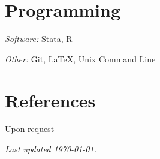 \documentclass[letterpaper]{article}
\renewenvironment{itemize}{
  \begin{list}{}{
    \setlength{\leftmargin}{1.5em}
  }
}{
  \end{list}
}
\begin{document}

\section*{Programming}

\begin{itemize}
    \item \textit{Software:} \hspace{10pt} Stata, R
    
    \item \textit{Other:} \hspace{22pt} Git, LaTeX, Unix Command Line 
\end{itemize}


\section*{References}

\begin{itemize}
    \item Upon request
\end{itemize}

\bigskip

\vfill 
\begin{itemize}
    \item \emph{Last updated {\today}.}
\end{itemize}
\end{document}
